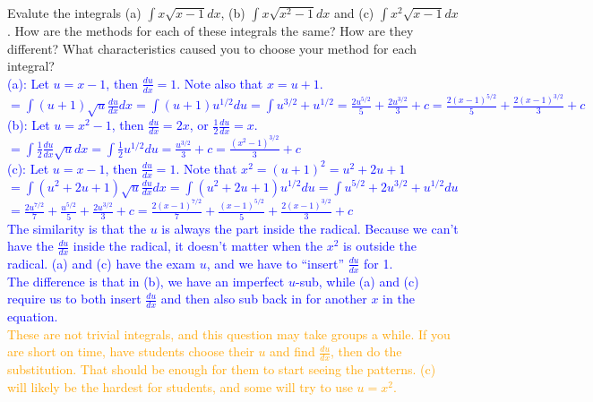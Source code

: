 \documentclass{ximera}
\begin{document}
\begin{exercise}
    Evalute the integrals (a) $\int x\sqrt{x-1}dx$, (b) $\int x\sqrt{x^2-1}dx$ and (c) $\int x^2\sqrt{x-1}dx$.  How are the methods for each of these integrals the same?  How are they different?  What characteristics caused you to choose your method for each integral?\\
    \textcolor{blue}{(a): Let $u=x-1$, then $\frac{du}{dx}=1$.  Note also that $x=u+1$.\\
    $=\int (u+1)\sqrt{u}\frac{du}{dx}dx=\int (u+1)u^{1/2}du=\int u^{3/2}+u^{1/2}=\frac{2u^{5/2}}{5}+\frac{2u^{3/2}}{3}+c=\frac{2(x-1)^{5/2}}{5}+\frac{2(x-1)^{3/2}}{3}+c$\\
    (b): Let $u=x^2-1$, then $\frac{du}{dx}=2x$, or $\frac{1}{2}\frac{du}{dx}=x$.\\
    $=\int \frac{1}{2}\frac{du}{dx}\sqrt{u}dx=\int \frac{1}{2}u^{1/2}du=\frac{u^{3/2}}{3}+c=\frac{(x^2-1)^{3/2}}{3}+c$\\
    (c): Let $u=x-1$, then $\frac{du}{dx}=1$.  Note that $x^2=(u+1)^2=u^2+2u+1$\\
    $=\int (u^2+2u+1)\sqrt{u}\frac{du}{dx}dx=\int (u^2+2u+1)u^{1/2}du=\int u^{5/2}+2u^{3/2}+u^{1/2}du$\\
    $=\frac{2u^{7/2}}{7}+\frac{u^{5/2}}{5}+\frac{2u^{3/2}}{3}+c=\frac{2(x-1)^{7/2}}{7}+\frac{(x-1)^{5/2}}{5}+\frac{2(x-1)^{3/2}}{3}+c$\\
    The similarity is that the $u$ is always the part inside the radical.  Because we can't have the $\frac{du}{dx}$ inside the radical, it doesn't matter when the $x^2$ is outside the radical.  (a) and (c) have the exam $u$, and we have to ``insert'' $\frac{du}{dx}$ for 1. \\
    The difference is that in (b), we have an imperfect $u$-sub, while (a) and (c) require us to both insert $\frac{du}{dx}$ and then also sub back in for another $x$ in the equation.  }\\
    \textcolor{orange}{These are not trivial integrals, and this question may take groups a while. If you are short on time, have students choose their $u$ and find $\frac{du}{dx}$, then do the substitution.  That should be enough for them to start seeing the patterns.  (c) will likely be the hardest for students, and some will try to use $u=x^2$. }
\end{exercise}
\end{document}
